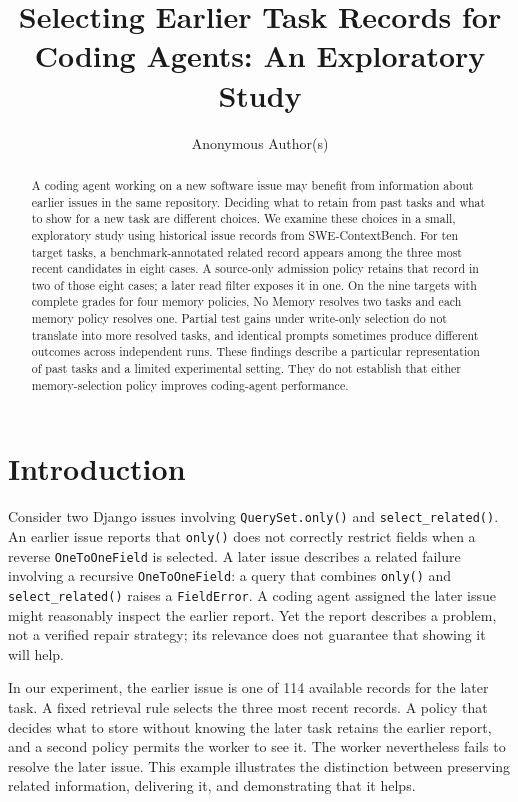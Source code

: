 \documentclass[sigconf,anonymous]{aamas}
\title{Selecting Earlier Task Records for Coding Agents: An Exploratory Study}
\author{Anonymous Author(s)}
\affiliation{\institution{Anonymous}}
\begin{document}
\begin{abstract}
A coding agent working on a new software issue may benefit from information about earlier issues in the same repository. Deciding what to retain from past tasks and what to show for a new task are different choices. We examine these choices in a small, exploratory study using historical issue records from SWE-ContextBench. For ten target tasks, a benchmark-annotated related record appears among the three most recent candidates in eight cases. A source-only admission policy retains that record in two of those eight cases; a later read filter exposes it in one. On the nine targets with complete grades for four memory policies, No Memory resolves two tasks and each memory policy resolves one. Partial test gains under write-only selection do not translate into more resolved tasks, and identical prompts sometimes produce different outcomes across independent runs. These findings describe a particular representation of past tasks and a limited experimental setting. They do not establish that either memory-selection policy improves coding-agent performance.
\end{abstract}
\maketitle

\section{Introduction}
Consider two Django issues involving \texttt{QuerySet.only()} and \texttt{select\_related()}. An earlier issue reports that \texttt{only()} does not correctly restrict fields when a reverse \texttt{OneToOneField} is selected. A later issue describes a related failure involving a recursive \texttt{OneToOneField}: a query that combines \texttt{only()} and \texttt{select\_related()} raises a \texttt{FieldError}. A coding agent assigned the later issue might reasonably inspect the earlier report. Yet the report describes a problem, not a verified repair strategy; its relevance does not guarantee that showing it will help.

In our experiment, the earlier issue is one of 114 available records for the later task. A fixed retrieval rule selects the three most recent records. A policy that decides what to store without knowing the later task retains the earlier report, and a second policy permits the worker to see it. The worker nevertheless fails to resolve the later issue. This example illustrates the distinction between preserving related information, delivering it, and demonstrating that it helps.
\end{document}
